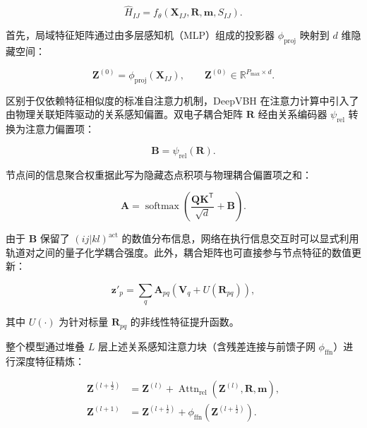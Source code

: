 \begin{equation}
\hat{H}_{IJ} = f_{\theta}(\mathbf{X}_{IJ}, \mathbf{R}, \mathbf{m}, S_{IJ}).
\end{equation}

首先，局域特征矩阵通过由多层感知机（MLP）组成的投影器 $\phi_{\mathrm{proj}}$ 映射到 $d$ 维隐藏空间：

\begin{equation}
\mathbf{Z}^{(0)} = \phi_{\mathrm{proj}}(\mathbf{X}_{IJ}),\qquad \mathbf{Z}^{(0)} \in \mathbb{R}^{P_{\max} \times d}.
\end{equation}

区别于仅依赖特征相似度的标准自注意力机制\cite{vaswani2017}，DeepVBH 在注意力计算中引入了由物理关联矩阵驱动的关系感知偏置\cite{shaw2018relative}。双电子耦合矩阵 $\mathbf{R}$ 经由关系编码器 $\psi_{\mathrm{rel}}$ 转换为注意力偏置项：

\begin{equation}
\mathbf{B} = \psi_{\mathrm{rel}}(\mathbf{R}).
\end{equation}

节点间的信息聚合权重据此写为隐藏态点积项与物理耦合偏置项之和：

\begin{equation}
\mathbf{A} = \operatorname{softmax}\!\left(\frac{\mathbf{Q}\mathbf{K}^\mathsf{T}}{\sqrt{d}} + \mathbf{B}\right).
\end{equation}

由于 $\mathbf{B}$ 保留了 $(ij|kl)^{\mathrm{act}}$ 的数值分布信息，网络在执行信息交互时可以显式利用轨道对之间的量子化学耦合强度。此外，耦合矩阵也可直接参与节点特征的数值更新：

\begin{equation}
\mathbf{z}'_p = \sum_q \mathbf{A}_{pq}\left(\mathbf{V}_q + U(\mathbf{R}_{pq})\right),
\end{equation}

其中 $U(\cdot)$ 为针对标量 $\mathbf{R}_{pq}$ 的非线性特征提升函数。

整个模型通过堆叠 $L$ 层上述关系感知注意力块（含残差连接与前馈子网 $\phi_{\mathrm{ffn}}$）进行深度特征精炼：

\begin{align}
\mathbf{Z}^{\left(l + \frac{1}{2}\right)} &= \mathbf{Z}^{(l)} + \operatorname{Attn}_{\mathrm{rel}}\!\left(\mathbf{Z}^{(l)}, \mathbf{R}, \mathbf{m}\right), \\
\mathbf{Z}^{(l+1)} &= \mathbf{Z}^{\left(l + \frac{1}{2}\right)} + \phi_{\mathrm{ffn}}\!\left(\mathbf{Z}^{\left(l + \frac{1}{2}\right)}\right).
\end{align}

